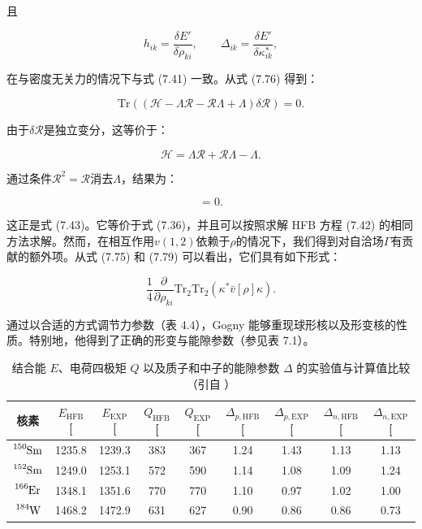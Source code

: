 且

\begin{equation}
h_{ik}=\frac{\delta E'}{\delta\rho_{ki}},\qquad\Delta_{ik}=\frac{\delta E'}{\delta\kappa^{*}_{ik}},\label{eq:hik_deltaik_derivatives}
\end{equation}

在与密度无关力的情况下与式 (7.41) 一致。从式 (7.76) 得到：

\begin{equation}
\mathrm{Tr}((\mathcal{H}-\Lambda\mathcal{R}-\mathcal{R}\Lambda+\Lambda)\delta\mathcal{R})=0.\label{eq:tr_lambda_R}
\end{equation}

由于$\delta\mathcal{R}$是独立变分，这等价于：

\begin{equation}
\mathcal{H}=\Lambda\mathcal{R}+\mathcal{R}\Lambda-\Lambda.\label{eq:H_lambda_R_relation}
\end{equation}

通过条件$\mathcal{R}^{2}=\mathcal{R}$消去$\Lambda$，结果为：

\begin{equation}
[\mathcal{H},\mathcal{R}]=0.\label{eq:H_R_commutator_zero}
\end{equation}

这正是式 (7.43)。它等价于式 (7.36)，并且可以按照求解 HFB 方程 (7.42) 的相同方法求解。然而，在相互作用$v(1,2)$依赖于$\rho$的情况下，我们得到对自洽场$\Gamma$有贡献的额外项。从式
(7.75) 和 (7.79) 可以看出，它们具有如下形式：

\begin{equation}
\frac{1}{4}\frac{\partial}{\partial\rho_{ki}}\mathrm{Tr}_{2}\mathrm{Tr}_{2}(\kappa^{*}\bar{v}[\rho]\kappa).\label{eq:rearrangement_term_pairing}
\end{equation}

通过以合适的方式调节力参数（表 4.4），Gogny 能够重现球形核以及形变核的性质。特别地，他得到了正确的形变与能隙参数（参见表
7.1）。

\begin{table}[H]
\begin{centering}
\caption{\label{tab:7_1_=007ED3=005408=0080FD=007535=008377=0056DB=006781=0077E9=0080FD=009699=006BD4=008F83}结合能
$E$、电荷四极矩 $Q$ 以及质子和中子的能隙参数 $\Delta$ 的实验值与计算值比较（引自 \cite{Go75b}）}
\par\end{centering}
\centering{}%
\begin{tabular}{ccccccccc}
\hline 
核素 & $E_{\text{HFB}}$ {[} & $E_{\text{EXP}}$ {[} & $Q_{\text{HFB}}$ {[} & $Q_{\text{EXP}}$ {[} & $\Delta_{p,\text{HFB}}$ {[} & $\Delta_{p,\text{EXP}}$ {[} & $\Delta_{n,\text{HFB}}$ {[} & $\Delta_{n,\text{EXP}}$ {[}\tabularnewline
\hline 
$\ce{^{150}Sm}$ & 1235.8 & 1239.3 & 383 & 367 & 1.24 & 1.43 & 1.13 & 1.13\tabularnewline
$\ce{^{152}Sm}$ & 1249.0 & 1253.1 & 572 & 590 & 1.14 & 1.08 & 1.09 & 1.24\tabularnewline
$\ce{^{166}Er}$ & 1348.1 & 1351.6 & 770 & 770 & 1.10 & 0.97 & 1.02 & 1.00\tabularnewline
$\ce{^{184}W}$ & 1468.2 & 1472.9 & 631 & 627 & 0.90 & 0.86 & 0.86 & 0.73\tabularnewline
\hline 
\end{tabular}
\end{table}

